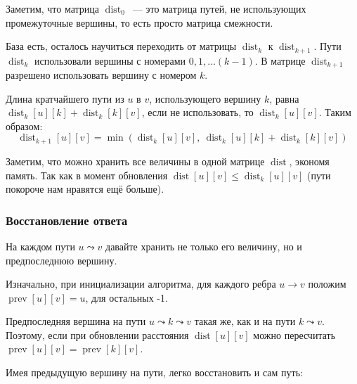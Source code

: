 \documentclass[a4paper,12pt]{article}
\renewcommand{\le}{\leqslant}
\DeclareMathOperator{\dist}{dist}
\DeclareMathOperator{\prev}{prev}
\begin{document}
      Заметим, что матрица $\dist_0$~--- это матрица путей, не использующих
      промежуточные вершины, то есть просто матрица смежности.
      
      База есть, осталось научиться переходить от матрицы $\dist_k$ к $\dist_{k+1}$.
      Пути $\dist_k$ использовали вершины с номерами $0, 1, \dots (k-1)$.
      В матрице $\dist_{k+1}$ разрешено использовать вершину с номером $k$.
      
      Длина кратчайшего пути из $u$ в $v$, использующего вершину $k$, равна
      $\dist_k[u][k] + \dist_k[k][v]$, если не использовать, то $\dist_k[u][v]$.
      Таким образом: \[
        \dist_{k+1}[u][v] =
        \min\left(\dist_k[u][v],\ \dist_k[u][k] + \dist_k[k][v]\right)
      \]

      \noindent\begin{minipage}{\textwidth}
      
      \end{minipage}

      Заметим, что можно хранить все величины в одной матрице $\dist$, экономя память.
      Так как в момент обновления $\dist[u][v] \le \dist_k[u][v]$
      (пути покороче нам нравятся ещё больше).

      \subsubsection{Восстановление ответа}
      На каждом пути $u \leadsto v$ давайте хранить не только его величину, но и
      предпоследнюю вершину.

      Изначально, при инициализации алгоритма, для каждого ребра ${u \to v}$ положим
      $\prev[u][v] = u$, для остальных -1.
      
      Предпоследняя вершина на пути $u \leadsto k \leadsto v$ такая же,
      как и на пути $k \leadsto v$. Поэтому, если
      при обновлении расстояния $\dist[u][v]$ можно пересчитать
      $\prev[u][v] = \prev[k][v]$.
      
      Имея предыдущую вершину на пути, легко восстановить и сам путь:
      
      
\end{document}
